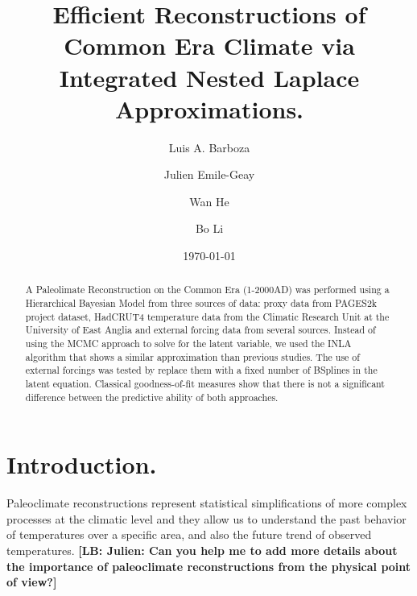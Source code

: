 \documentclass[11pt]{amsart}
\theoremstyle{plain}
\theoremstyle{definition}
\theoremstyle{remark}
\newcommand{\lb}[1]{\color{MidnightBlue}\textbf{[LB: #1]}\normalcolor}
\begin{document}
\title[Paleoclimate Reconstruction using INLA.]{Efficient Reconstructions of Common Era Climate via Integrated Nested Laplace Approximations.}

\author{Luis A. Barboza}
\address{Centro de Investigacion en Matematica Pura y Aplicada (CIMPA)-Escuela
  de Matematica, Universidad de Costa Rica\\
San Jos\'e, Costa Rica}


\author{Julien Emile-Geay}
\address{Department of Earth Sciences \\
  University of Southern California \\
  Los Angeles, California, USA.
}

\author{Wan He}

\author{Bo Li}
\address{Department of Statistics \\
  University of Illinois at Urbana-Champaign \\
  Champaign, Illinois, USA.
}



\date{\today}
\subjclass[2010]{}
\maketitle

\begin{abstract}
A Paleolimate Reconstruction on the Common Era (1-2000AD) was performed using a
Hierarchical Bayesian Model from three sources of data: proxy data from PAGES2k
project dataset, HadCRUT4 temperature data from the Climatic Research Unit
at the University of East Anglia and external forcing data from several sources.
Instead of using the MCMC approach to solve for the latent variable, we used the
INLA algorithm that shows a similar approximation than previous studies. The use
of external forcings was tested by replace them with a fixed number of
BSplines in the latent equation. Classical goodness-of-fit measures show that there is not a significant
difference between the predictive ability of both approaches. 
\end{abstract}

\section{Introduction.}
\label{sec:intro}

Paleoclimate reconstructions represent statistical simplifications of more
complex processes at the climatic level and they allow us to understand the past
behavior of temperatures over a specific area, and also the future trend of
observed temperatures. \lb{Julien: Can you help me to add more details about the
importance of paleoclimate reconstructions from the physical point of view?}
\end{document}

